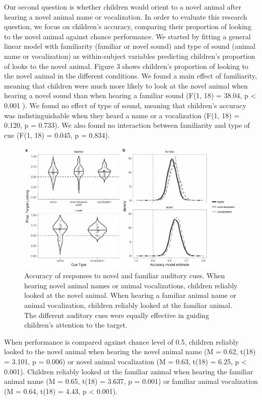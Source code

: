 \documentclass[english,floatsintext,man]{apa6}
\theoremstyle{definition}
\theoremstyle{definition}
\theoremstyle{definition}
\theoremstyle{remark}
\begin{document}
Our second question is whether children would orient to a novel animal
after hearing a novel animal name or vocalization. In order to evaluate
this research question, we focus on children's accuracy, comparing their
proportion of looking to the novel animal against chance performance. We
started by fitting a general linear model with familiarity (familiar or
novel sound) and type of sound (animal name or vocalization) as
within-subject variables predicting children's proportion of looks to
the novel animal. Figure 3 shows children's proportion of looking to the
novel animal in the different conditions. We found a main effect of
familiarity, meaning that children were much more likely to look at the
novel animal when hearing a novel sound than when hearing a familiar
sound (F(1, 18) = 38.04, p \textless{} 0.001 ). We found no effect of
type of sound, meaning that children's accuracy was indistinguishable
when they heard a name or a vocalization (F(1, 18) = 0.120, p = 0.733).
We also found no interaction between familiarity and type of cue (F(1,
18) = 0.045, p = 0.834).

\begin{figure}
\centering
\includegraphics{anime_manuscript_files/figure-latex/unnamed-chunk-5-1.pdf}
\caption{\label{fig:unnamed-chunk-5}Accuracy of responses to novel and
familiar auditory cues. When hearing novel animal names or animal
vocalizations, children reliably looked at the novel animal. When
hearing a familiar animal name or animal vocalization, children reliably
looked at the familiar animal. The different auditory cues were equally
effective in guiding children's attention to the target.}
\end{figure}

When performance is compared against chance level of 0.5, children
reliably looked to the novel animal when hearing the novel animal name
(M = 0.62, t(18) = 3.101, p = 0.006) or novel animal vocalization (M =
0.63, t(18) = 6.25, p \textless{} 0.001). Children reliably looked at
the familiar animal when hearing the familiar animal name (M = 0.65,
t(18) = 3.637, p = 0.001) or familiar animal vocalization (M = 0.64,
t(18) = 4.43, p \textless{} 0.001).
\end{document}

